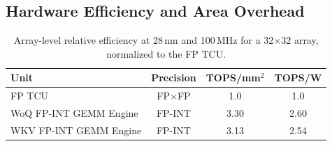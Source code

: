 \documentclass[sigconf,anonymous,nonacm]{acmart}
\newcommand{\fpint}{FP-INT}
\begin{document}
\subsection{Hardware Efficiency and Area Overhead}
\label{sec:eval-hw-efficiency}



\begin{table}[t]
\centering
\caption{Array-level relative efficiency at 28\,nm and 100\,MHz for a
32$\times$32 array, normalized to the FP TCU.}
\label{tab:array-level}
\setlength{\tabcolsep}{3pt}
\begin{tabularx}{\columnwidth}{@{}>{\raggedright\arraybackslash}Xccc@{}}
\toprule
Unit & Precision & TOPS/mm$^2$ & TOPS/W \\
\midrule
FP TCU & FP$\times$FP & 1.0 & 1.0 \\
WoQ \fpint{} GEMM Engine & \fpint{} & 3.30 & 2.60 \\
WKV \fpint{} GEMM Engine & \fpint{} & 3.13 & 2.54 \\
\bottomrule
\end{tabularx}
\end{table}
\end{document}
